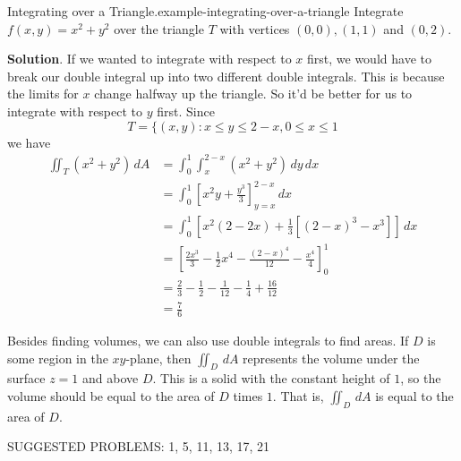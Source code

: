 \documentclass[10pt,]{book}
\numberwithin{equation}{section}
\begin{document}
\begin{example}{Integrating over a Triangle.}{example-integrating-over-a-triangle}%
\hypertarget{p-1480}{}%
Integrate \(f(x,y) = x^{2} + y^{2}\) over the triangle \(T\) with vertices \((0,0), (1,1)\) and \((0,2)\).%
\par\smallskip%
\noindent\textbf{Solution}.\hypertarget{solution-243}{}\quad%
\hypertarget{p-1481}{}%
If we wanted to integrate with respect to \(x\) first, we would have to break our double integral up into two different double integrals. This is because the limits for \(x\) change halfway up the triangle. So it'd be better for us to integrate with respect to \(y\) first. Since%
\begin{equation*}
T = \{(x,y) : x \leq y \leq 2-x, 0\leq x\leq 1
\end{equation*}
we have%
\begin{align*}
\iint_{T}(x^{2} + y^{2})\,dA & = \int_{0}^{1}\int_{x}^{2-x}(x^{2} + y^{2})\,dy\,dx \\
& = \int_{0}^{1}\left[x^{2}y + \frac{y^{3}}{3}\right]_{y=x}^{2-x}\,dx \\
& = \int_{0}^{1} \left[x^{2}(2-2x) + \frac{1}{3}[(2-x)^{3} - x^{3}]\right]\,dx \\
& = \left[\frac{2x^{3}}{3} - \frac{1}{2}x^{4} - \frac{(2-x)^{4}}{12} - \frac{x^{4}}{4}\right]_{0}^{1} \\
& = \frac{2}{3} - \frac{1}{2} - \frac{1}{12} - \frac{1}{4} + \frac{16}{12} \\
& = \frac{7}{6} 
\end{align*}
%
\end{example}
\hypertarget{p-1482}{}%
Besides finding volumes, we can also use double integrals to find areas. If \(D\) is some region in the \(xy\)-plane, then \(\iint_{D}\,dA\) represents the volume under the surface \(z=1\) and above \(D\). This is a solid with the constant height of \(1\), so the volume should be equal to the area of \(D\) times \(1\). That is, \(\iint_{D}\,dA\) is equal to the area of \(D\).%
\par
\hypertarget{p-1483}{}%
SUGGESTED PROBLEMS: 1, 5, 11, 13, 17, 21%
%
%
\typeout{************************************************}
\typeout{************************************************}
%
\end{document}
